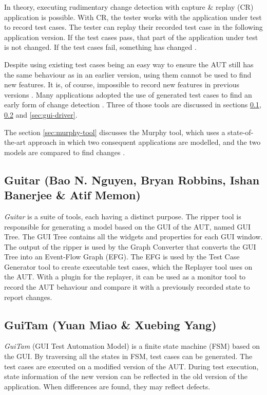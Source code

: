 In theory, executing rudimentary change detection with capture \& replay (CR) application is possible. With CR, the tester works with the application under test to record test cases. The tester can replay their recorded test case in the following application version. If the test cases pass, that part of the application under test is not changed. If the test cases fail, something has changed \cite{VosAho2021}.

Despite using existing test cases being an easy way to ensure the AUT still has the same behaviour as in an earlier version, using them cannot be used to find new features. It is, of course, impossible to record new features in previous versions \cite{VosAho2021}. Many applications adopted the use of generated test cases to find an early form of change detection \cite{aho2019automated}. Three of those tools are discussed in sections \ref{sec:guitar}, \ref{sec:guitam} and \ref{sec:gui-driver}.

The section \ref{sec:murphy-tool} discusses the Murphy tool, which uses a state-of-the-art approach in which two consequent applications are modelled, and the two models are compared to find changes \cite{aho2019automated}.

\subsection{Guitar (Bao N. Nguyen, Bryan Robbins, Ishan Banerjee \& Atif Memon)} \label{sec:guitar}

\emph{Guitar} \cite{nguyen2014guitar} is a suite of tools, each having a distinct purpose. The ripper tool is responsible for generating a model based on the GUI of the AUT, named GUI Tree. The GUI Tree contains all the widgets and properties for each GUI window. The output of the ripper is used by the Graph Converter that converts the GUI Tree into an Event-Flow Graph (EFG). The EFG is used by the Test Case Generator tool to create executable test cases, which the Replayer tool uses on the AUT. With a plugin for the replayer, it can be used as a monitor tool to record the AUT behaviour and compare it with a previously recorded state to report changes.

\subsection{GuiTam (Yuan Miao \& Xuebing Yang)} \label{sec:guitam}
\emph{GuiTam} \cite{miao2010fsm} (GUI Test Automation Model) is a finite state machine (FSM) based on the GUI. By traversing all the states in FSM, test cases can be generated. The test cases are executed on a modified version of the AUT. During test execution, state information of the new version can be reflected in the old version of the application. When differences are found, they may reflect defects. 

